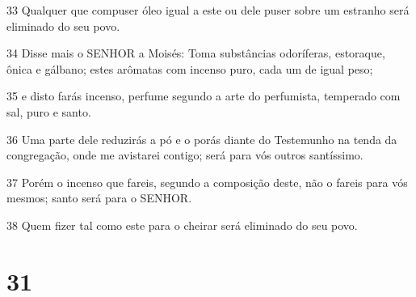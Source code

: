 \par 33 Qualquer que compuser óleo igual a este ou dele puser sobre um estranho será eliminado do seu povo.
\par 34 Disse mais o SENHOR a Moisés: Toma substâncias odoríferas, estoraque, ônica e gálbano; estes arômatas com incenso puro, cada um de igual peso;
\par 35 e disto farás incenso, perfume segundo a arte do perfumista, temperado com sal, puro e santo.
\par 36 Uma parte dele reduzirás a pó e o porás diante do Testemunho na tenda da congregação, onde me avistarei contigo; será para vós outros santíssimo.
\par 37 Porém o incenso que fareis, segundo a composição deste, não o fareis para vós mesmos; santo será para o SENHOR.
\par 38 Quem fizer tal como este para o cheirar será eliminado do seu povo.

\chapter{31}

